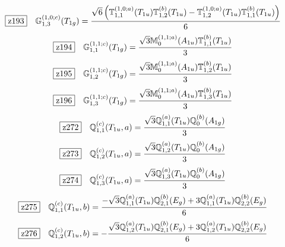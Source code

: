 \documentclass[fleqn,10pt,landscape]{jsarticle}
\begin{document}
\begin{dmath*}
\hspace*{3mm}\fbox{z193}\quad \mathbb{G}_{1,3}^{(1,0;c)}(T_{1g})=\frac{\sqrt{6} \left(\mathbb{T}_{1,1}^{(1,0;a)}(T_{1u}) \mathbb{T}_{1,2}^{(b)}(T_{1u}) - \mathbb{T}_{1,2}^{(1,0;a)}(T_{1u}) \mathbb{T}_{1,1}^{(b)}(T_{1u})\right)}{6}
\end{dmath*}
\begin{dmath*}
\hspace*{3mm}\fbox{z194}\quad \mathbb{G}_{1,1}^{(1,1;c)}(T_{1g})=\frac{\sqrt{3} \mathbb{M}_{0}^{(1,1;a)}(A_{1u}) \mathbb{T}_{1,1}^{(b)}(T_{1u})}{3}
\end{dmath*}
\begin{dmath*}
\hspace*{3mm}\fbox{z195}\quad \mathbb{G}_{1,2}^{(1,1;c)}(T_{1g})=\frac{\sqrt{3} \mathbb{M}_{0}^{(1,1;a)}(A_{1u}) \mathbb{T}_{1,2}^{(b)}(T_{1u})}{3}
\end{dmath*}
\begin{dmath*}
\hspace*{3mm}\fbox{z196}\quad \mathbb{G}_{1,3}^{(1,1;c)}(T_{1g})=\frac{\sqrt{3} \mathbb{M}_{0}^{(1,1;a)}(A_{1u}) \mathbb{T}_{1,3}^{(b)}(T_{1u})}{3}
\end{dmath*}
\begin{dmath*}
\hspace*{3mm}\fbox{z272}\quad \mathbb{Q}_{1,1}^{(c)}(T_{1u},a)=\frac{\sqrt{3} \mathbb{Q}_{1,1}^{(a)}(T_{1u}) \mathbb{Q}_{0}^{(b)}(A_{1g})}{3}
\end{dmath*}
\begin{dmath*}
\hspace*{3mm}\fbox{z273}\quad \mathbb{Q}_{1,2}^{(c)}(T_{1u},a)=\frac{\sqrt{3} \mathbb{Q}_{1,2}^{(a)}(T_{1u}) \mathbb{Q}_{0}^{(b)}(A_{1g})}{3}
\end{dmath*}
\begin{dmath*}
\hspace*{3mm}\fbox{z274}\quad \mathbb{Q}_{1,3}^{(c)}(T_{1u},a)=\frac{\sqrt{3} \mathbb{Q}_{1,3}^{(a)}(T_{1u}) \mathbb{Q}_{0}^{(b)}(A_{1g})}{3}
\end{dmath*}
\begin{dmath*}
\hspace*{3mm}\fbox{z275}\quad \mathbb{Q}_{1,1}^{(c)}(T_{1u},b)=\frac{- \sqrt{3} \mathbb{Q}_{1,1}^{(a)}(T_{1u}) \mathbb{Q}_{2,1}^{(b)}(E_{g}) + 3 \mathbb{Q}_{1,1}^{(a)}(T_{1u}) \mathbb{Q}_{2,2}^{(b)}(E_{g})}{6}
\end{dmath*}
\begin{dmath*}
\hspace*{3mm}\fbox{z276}\quad \mathbb{Q}_{1,2}^{(c)}(T_{1u},b)=- \frac{\sqrt{3} \mathbb{Q}_{1,2}^{(a)}(T_{1u}) \mathbb{Q}_{2,1}^{(b)}(E_{g}) + 3 \mathbb{Q}_{1,2}^{(a)}(T_{1u}) \mathbb{Q}_{2,2}^{(b)}(E_{g})}{6}
\end{dmath*}
\end{document}
